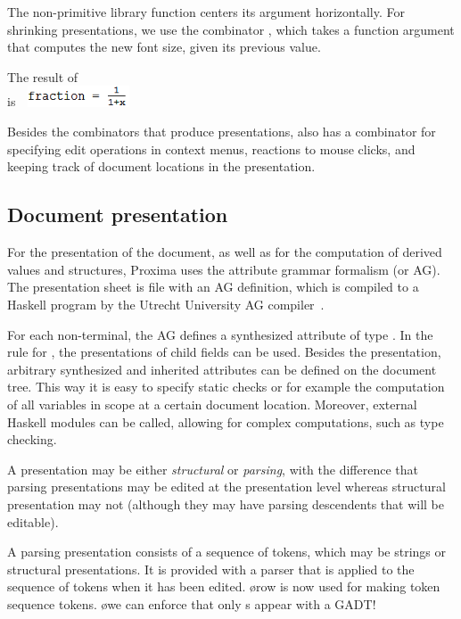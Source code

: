 \documentclass[12pt]{article}
\begin{document}
The non-primitive library function  centers its argument horizontally. For shrinking presentations, we use the combinator , which takes a function argument that computes the new font size, given its previous value.

The result of \\ 
is~~\includegraphics[width=3cm]{images/fracExample}

Besides the combinators that produce presentations, \Xprez also has a combinator for specifying edit operations in context menus, reactions to mouse clicks, and keeping track of document locations in the presentation. 


\subsection{Document presentation}

For the presentation of the document, as well as for the computation of derived values and structures, Proxima uses the attribute grammar formalism (or AG). The presentation sheet is file with an AG definition, which is compiled to a Haskell program by the Utrecht University AG compiler~\cite{swierstra08ag}.

For each non-terminal, the AG defines a synthesized attribute  of type . In the rule for , the presentations of child fields can be used. Besides the presentation, arbitrary synthesized and inherited attributes can be defined on the document tree. This way it is easy to specify static checks or for example the computation of all variables in scope at a certain document location. Moreover, external Haskell modules can be called, allowing for complex computations, such as type checking.


A presentation may be either {\em structural} or {\em parsing}, with the difference that parsing presentations may be edited at the presentation level whereas structural presentation may not (although they may have parsing descendents that will be editable). 

A parsing presentation consists of a sequence of tokens, which may be strings or structural presentations. It is provided with a parser that is applied to the sequence of tokens when it has been edited. 
\bl %
\o row is now used for making token sequence tokens.
\o we can enforce that only s appear with a GADT!
\el
\end{document}
